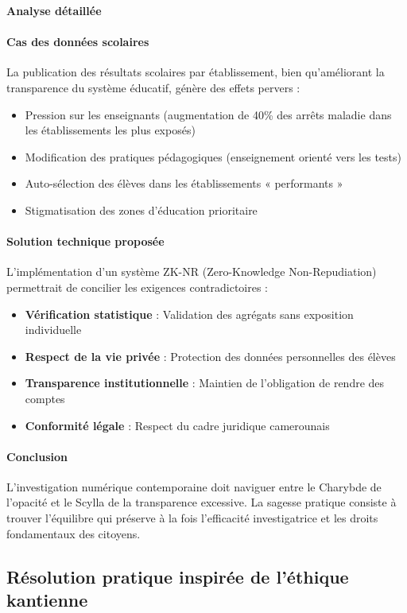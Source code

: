\documentclass[12pt,a4paper]{article}
\begin{document}
\textbf{Analyse détaillée}

\paragraph{Cas des données scolaires}
La publication des résultats scolaires par établissement, bien qu'améliorant la transparence du système éducatif, génère des effets pervers :
\begin{itemize}
\item Pression sur les enseignants (augmentation de 40\% des arrêts maladie dans les établissements les plus exposés)
\item Modification des pratiques pédagogiques (enseignement orienté vers les tests)
\item Auto-sélection des élèves dans les établissements « performants »
\item Stigmatisation des zones d'éducation prioritaire
\end{itemize}

\paragraph{Solution technique proposée}
L'implémentation d'un système ZK-NR (Zero-Knowledge Non-Repudiation) permettrait de concilier les exigences contradictoires :
\begin{itemize}
\item \textbf{Vérification statistique} : Validation des agrégats sans exposition individuelle
\item \textbf{Respect de la vie privée} : Protection des données personnelles des élèves
\item \textbf{Transparence institutionnelle} : Maintien de l'obligation de rendre des comptes
\item \textbf{Conformité légale} : Respect du cadre juridique camerounais
\end{itemize}
\paragraph{Conclusion}

L'investigation numérique contemporaine doit naviguer entre le Charybde de l'opacité et le Scylla de la transparence excessive. La sagesse pratique consiste à trouver l'équilibre qui préserve à la fois l'efficacité investigatrice et les droits fondamentaux des citoyens.

\subsection{Résolution pratique inspirée de l'éthique kantienne}
\end{document}
